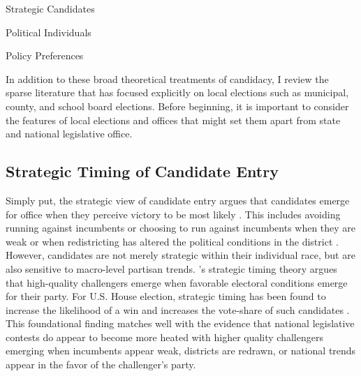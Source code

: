 \begin{myitemize}
\item Strategic Candidates
\item Political Individuals
\item Policy Preferences
\end{myitemize}

In addition to these broad theoretical treatments of candidacy, I review the sparse 
literature that has focused explicitly on local elections such as municipal, county, 
and school board elections. Before beginning, it is important to consider the features 
of local elections and offices that might set them apart from state and national 
legislative office. 


\subsection{Strategic Timing of Candidate Entry}

Simply put, the strategic view of candidate entry argues that candidates emerge for 
office when they perceive victory to be most likely \citep{schlesinger1}. This 
includes avoiding running against incumbents or choosing to run against incumbents 
when they are weak or when redistricting has altered the political conditions in 
the district \citep{Black1972}. However, candidates are not merely strategic 
within their individual race, but are also sensitive to macro-level partisan trends.
\citet{JacobsonBook}'s strategic timing theory argues that high-quality challengers 
emerge when favorable electoral conditions emerge for their party. For U.S. House election, 
strategic timing has been found to increase the likelihood of a win 
and increases the vote-share of such candidates \citep{JacobsonStrategy}. This 
foundational finding matches well with the evidence that 
national legislative contests do appear to become more heated with higher quality 
challengers emerging when incumbents appear weak, districts are redrawn, or 
national trends appear in the favor of the challenger's party. 

